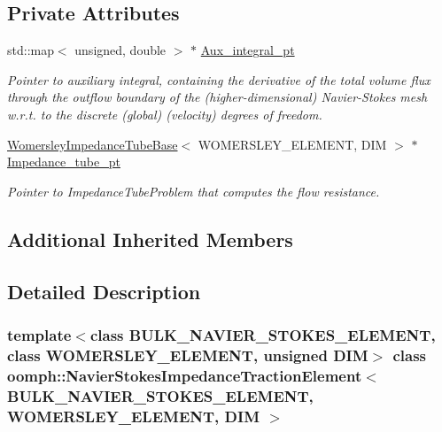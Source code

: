 \subsection*{Private Attributes}
\begin{DoxyCompactItemize}
\item 
std\+::map$<$ unsigned, double $>$ $\ast$ \hyperlink{classoomph_1_1NavierStokesImpedanceTractionElement_a15020b8235206fc52d2fcf967e471904}{Aux\+\_\+integral\+\_\+pt}
\begin{DoxyCompactList}\small\item\em Pointer to auxiliary integral, containing the derivative of the total volume flux through the outflow boundary of the (higher-\/dimensional) Navier-\/\+Stokes mesh w.\+r.\+t. to the discrete (global) (velocity) degrees of freedom. \end{DoxyCompactList}\item 
\hyperlink{classoomph_1_1WomersleyImpedanceTubeBase}{Womersley\+Impedance\+Tube\+Base}$<$ W\+O\+M\+E\+R\+S\+L\+E\+Y\+\_\+\+E\+L\+E\+M\+E\+NT, D\+IM $>$ $\ast$ \hyperlink{classoomph_1_1NavierStokesImpedanceTractionElement_a65123707e91f7a351bb9cffb64e1b81c}{Impedance\+\_\+tube\+\_\+pt}
\begin{DoxyCompactList}\small\item\em Pointer to Impedance\+Tube\+Problem that computes the flow resistance. \end{DoxyCompactList}\end{DoxyCompactItemize}
\subsection*{Additional Inherited Members}


\subsection{Detailed Description}
\subsubsection*{template$<$class B\+U\+L\+K\+\_\+\+N\+A\+V\+I\+E\+R\+\_\+\+S\+T\+O\+K\+E\+S\+\_\+\+E\+L\+E\+M\+E\+NT, class W\+O\+M\+E\+R\+S\+L\+E\+Y\+\_\+\+E\+L\+E\+M\+E\+NT, unsigned D\+IM$>$\newline
class oomph\+::\+Navier\+Stokes\+Impedance\+Traction\+Element$<$ B\+U\+L\+K\+\_\+\+N\+A\+V\+I\+E\+R\+\_\+\+S\+T\+O\+K\+E\+S\+\_\+\+E\+L\+E\+M\+E\+N\+T, W\+O\+M\+E\+R\+S\+L\+E\+Y\+\_\+\+E\+L\+E\+M\+E\+N\+T, D\+I\+M $>$}

